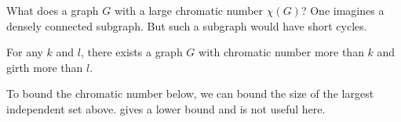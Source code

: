 What does a graph $G$ with a large chromatic number $\chi(G)$?
One imagines a densely connected subgraph.
But such a subgraph would have short cycles.
\begin{theorem}
    For any $k$ and $l$, there exists a graph $G$ with chromatic number
    more than $k$ and girth more than $l$.
\end{theorem}
To bound the chromatic number below, we can bound the size of the largest
independent set above.
 gives a lower bound and is not useful here.
%
%

